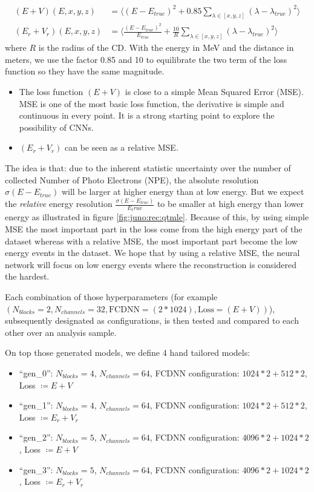 \documentclass[../main.tex]{subfiles}
\begin{document}
\begin{align}
  (E+V)(E, x, y, z) &= \bigg\langle (E - E_{true})^2 + 0.85 \sum_{\lambda \in [x, y, z]} (\lambda - \lambda_{true})^2 \bigg\rangle \\
  (E_r + V_r)(E, x, y, z) &=  \bigg\langle \frac{(E - E_{true}) ^ 2}{E_{true}} + \frac{10}{R} \sum_{\lambda \in [x, y, z]} (\lambda - \lambda_{true})^2 \bigg\rangle
\end{align}
where $R$ is the radius of the CD. With the energy in MeV and the distance in meters, we use the factor 0.85 and 10 to equilibrate the two term of the loss function so they have the same magnitude.
\begin{itemize}
  \item The loss function $(E+V)$ is close to a simple Mean Squared Error (MSE). MSE is one of the most basic loss function, the derivative is simple and continuous in every point. It is a strong starting point to explore the possibility of CNNs.
  \item $(E_r + V_r)$ can be seen as a relative MSE.
\end{itemize}
The idea is that: due to the inherent statistic uncertainty over the number of collected Number of Photo Electrons (NPE), the absolute resolution $\sigma (E - E_{true})$ will be larger at higher energy than at low energy. But we expect the \textit{relative} energy resolution $\frac{\sigma(E - E_{true})}{E_true}$ to be smaller at high energy than lower energy as illustrated in figure \ref{fig:juno:rec:qtmle}. Because of this, by using simple MSE the most important part in the loss come from the high energy part of the dataset whereas with a relative MSE, the most important part become the low energy events in the dataset. We hope that by using a relative MSE, the neural network will focus on low energy events where the reconstruction is considered the hardest.

Each combination of those hyperparameters (for example $(N_{blocks} = 2, N_{channels} = 32, \mathrm{FCDNN} = (2 * 1024), \mathrm{Loss} = (E+V))$), subsequently designated as configurations, is then tested and compared to each other over an analysis sample.

On top those generated models, we define 4 hand tailored models:
\begin{itemize}
  \item ``gen\_0'': $N_{blocks} = 4$, $N_{channels} = 64$, FCDNN configuration: $1024 * 2 + 512 * 2$, Loss $\coloneq E+V$
  \item ``gen\_1'': $N_{blocks} = 4$, $N_{channels} = 64$, FCDNN configuration: $1024 * 2 + 512 * 2$, Loss $\coloneq E_r+V_r$
  \item ``gen\_2'': $N_{blocks} = 5$, $N_{channels} = 64$, FCDNN configuration: $4096 * 2 + 1024 * 2$, Loss $\coloneq E+V$
  \item ``gen\_3'': $N_{blocks} = 5$, $N_{channels} = 64$, FCDNN configuration: $4096 * 2 + 1024 * 2$, Loss $\coloneq E_r+V_r$
\end{itemize}
\end{document}
